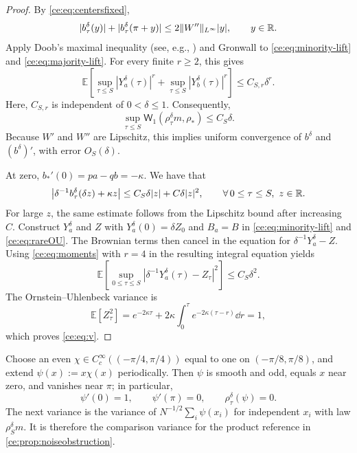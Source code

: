 \documentclass[11pt,reqno]{amsart}
\numberwithin{equation}{section}
\theoremstyle{plain}
\theoremstyle{remark}
\DeclarePairedDelimiter{\norm}{\lVert}{\rVert}
\newcommand{\E}{\mathbb E}\newcommand{\Q}{\mathbb Q}\newcommand{\Pb}{\mathbb P}
\begin{document}
\begin{proof}
By \eqref{ce:eq:centersfixed},
\begin{equation}\label{ce:eq:lift-drift-bound}
 |b^\delta_\tau(y)|+|b^\delta_\tau(\pi+y)|\le2\norm{W''}_{L^\infty}|y|,
 \qquad y\in\R.
\end{equation}
Apply Doob's maximal inequality (see, e.g., \cite[Chapter~II, Section~1]{RevuzYor}) and Gronwall to \eqref{ce:eq:minority-lift} and \eqref{ce:eq:majority-lift}. For every finite $r\ge2$, this gives
\begin{equation}\label{ce:eq:moments}
 \E\!\left[\sup_{\tau\le S}|Y_a^\delta(\tau)|^r
 +\sup_{\tau\le S}|Y_b^\delta(\tau)|^r\right]
 \le C_{S,r}\delta^r.
\end{equation}
Here, $C_{S,r}$ is independent of $0<\delta\le1$. Consequently,
\begin{equation}\label{ce:eq:W1}
 \sup_{\tau\le S}\mathsf W_1(\rho^\delta_\tau m,\rho_*)\le C_S\delta.
\end{equation}
Because $W'$ and $W''$ are Lipschitz, this implies uniform convergence of $b^\delta$ and $(b^\delta)'$, with error $O_S(\delta)$.

At zero, $b_*'(0)=pa-qb=-\kappa$. We have that
\begin{equation}\label{ce:eq:drifterror}
 \left|\delta^{-1}b^\delta_\tau(\delta z)+\kappa z\right|
 \le C_S\delta|z|+C\delta|z|^2,\qquad \forall\,0\le\tau\le S,\ z\in\R.
\end{equation}
For large $z$, the same estimate follows from the Lipschitz bound after increasing $C$. Construct $Y_a^\delta$ and $Z$ with $Y_a^\delta(0)=\delta Z_0$ and $B_a=B$ in \eqref{ce:eq:minority-lift} and \eqref{ce:eq:rareOU}. The Brownian terms then cancel in the equation for $\delta^{-1}Y_a^\delta-Z$. Using \eqref{ce:eq:moments} with $r=4$ in the resulting integral equation yields
\begin{equation}\label{ce:eq:minority-strong-limit}
 \E\left[\sup_{0\le\tau\le S}|\delta^{-1}Y_a^\delta(\tau)-Z_\tau|^2\right]
 \le C_S\delta^2.
\end{equation}
The Ornstein--Uhlenbeck variance is
\begin{equation}\label{ce:eq:OU-variance-calculation}
 \E[Z_\tau^2]=e^{-2\kappa\tau}+2\kappa\int_0^\tau e^{-2\kappa(\tau-r)}\dd r=1,
\end{equation}
which proves \eqref{ce:eq:v}.
\end{proof}

Choose an even $\chi\in C_c^\infty((-\pi/4,\pi/4))$ equal to one on $(-\pi/8,\pi/8)$, and extend $\psi(x):=x\chi(x)$ periodically. Then $\psi$ is smooth and odd, equals $x$ near zero, and vanishes near $\pi$; in particular,
\begin{equation}\label{ce:eq:terminaltest}
 \psi'(0)=1,\qquad \psi'(\pi)=0,\qquad \rho^\delta_\tau(\psi)=0.
\end{equation}
The next variance is the variance of $N^{-1/2}\sum_i\psi(x_i)$ for independent $x_i$ with law $\rho_S^\delta m$. It is therefore the comparison variance for the product reference in \cref{ce:prop:noiseobstruction}.
\end{document}
